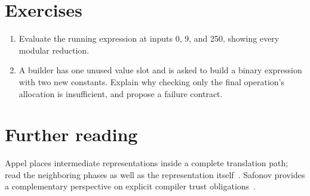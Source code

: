 \section{Exercises}
\label{sec:pebble-one-exercises}
\begin{enumerate}
\item \label{ex:pebble-wrap} Evaluate the running expression at inputs 0, 9, and 250, showing every modular reduction.
\item \label{ex:pebble-capacity-contract} A builder has one unused value slot and is asked to build a binary expression with two new constants. Explain why checking only the final operation's allocation is insufficient, and propose a failure contract.
\end{enumerate}

\section{Further reading}
\label{sec:pebble-one-reading}
Appel places intermediate representations inside a complete translation path; read the neighboring phases as well as the representation itself~\cite{appel-1998-modern}.
Safonov provides a complementary perspective on explicit compiler trust obligations~\cite{safonov-2010-trustworthy}.
